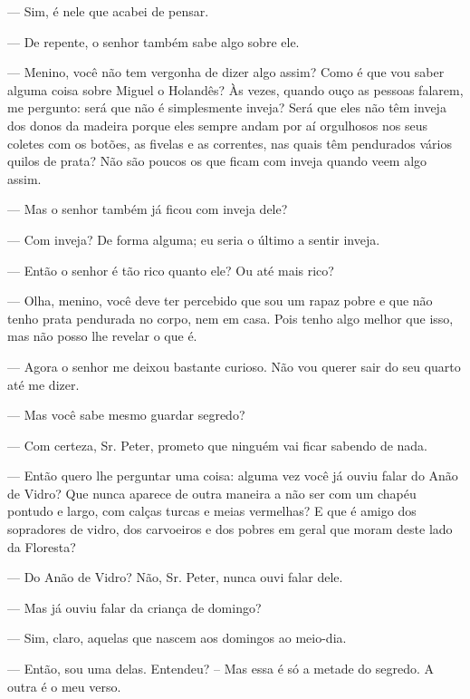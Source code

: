 \begin{myparindent}{0pt}
\begin{Parskip}
 --- Sim, é nele que acabei de pensar.

 --- De repente, o senhor também sabe algo sobre ele.

 --- Menino, você não tem vergonha de dizer algo
assim? Como é que vou saber alguma coisa sobre Miguel o Holandês? Às
vezes, quando ouço as pessoas falarem, me pergunto: será que não é
simplesmente inveja? Será que eles não têm inveja dos donos da madeira
porque eles sempre andam por aí orgulhosos nos seus coletes com os
botões, as fivelas e as correntes, nas quais têm pendurados vários
quilos de prata? Não são poucos os que ficam com inveja quando veem algo
assim.

 --- Mas o senhor também já ficou com inveja dele?

 --- Com inveja? De forma alguma; eu seria o último a
sentir inveja.

 --- Então o senhor é tão rico quanto ele? Ou até mais
rico?

 --- Olha, menino, você deve ter percebido que sou um
rapaz pobre e que não tenho prata pendurada no corpo, nem em casa. Pois
tenho algo melhor que isso, mas não posso lhe revelar o que é.

 --- Agora o senhor me deixou bastante curioso. Não vou
querer sair do seu quarto até me dizer.

 --- Mas você sabe mesmo guardar segredo?

 --- Com certeza, Sr. Peter, prometo que ninguém vai
ficar sabendo de nada.

 --- Então quero lhe perguntar uma coisa: alguma vez
você já ouviu falar do Anão de Vidro? Que nunca aparece de outra maneira
a não ser com um chapéu pontudo e largo, com calças turcas e meias
vermelhas? E que é amigo dos sopradores de vidro, dos carvoeiros e dos
pobres em geral que moram deste lado da Floresta?

 --- Do Anão de Vidro? Não, Sr. Peter, nunca ouvi falar
dele.

 --- Mas já ouviu falar da criança de domingo?

 --- Sim, claro, aquelas que nascem aos domingos ao
meio-dia.

 --- Então, sou uma delas. Entendeu? -- Mas essa é só
a metade do segredo. A outra é o meu verso.


\end{Parskip}
\end{myparindent}
